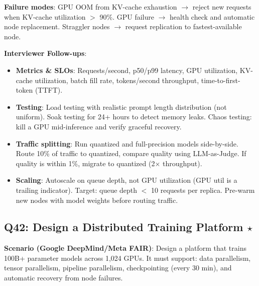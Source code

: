 \textbf{Failure modes}: GPU OOM from KV-cache exhaustion $\to$ reject new requests when KV-cache utilization $>$ 90\%. GPU failure $\to$ health check and automatic node replacement. Straggler nodes $\to$ request replication to fastest-available node.

\textbf{Interviewer Follow-ups}:
\begin{itemize}[leftmargin=*]
    \item \textbf{Metrics \& SLOs}: Requests/second, p50/p99 latency, GPU utilization, KV-cache utilization, batch fill rate, tokens/second throughput, time-to-first-token (TTFT).
    \item \textbf{Testing}: Load testing with realistic prompt length distribution (not uniform). Soak testing for 24+ hours to detect memory leaks. Chaos testing: kill a GPU mid-inference and verify graceful recovery.
    \item \textbf{Traffic splitting}: Run quantized and full-precision models side-by-side. Route 10\% of traffic to quantized, compare quality using LLM-as-Judge. If quality is within 1\%, migrate to quantized (2$\times$ throughput).
    \item \textbf{Scaling}: Autoscale on queue depth, not GPU utilization (GPU util is a trailing indicator). Target: queue depth $<$ 10 requests per replica. Pre-warm new nodes with model weights before routing traffic.
\end{itemize}

\subsection{Q42: Design a Distributed Training Platform $\star$}

\textbf{Scenario (Google DeepMind/Meta FAIR)}: Design a platform that trains 100B+ parameter models across 1,024 GPUs. It must support: data parallelism, tensor parallelism, pipeline parallelism, checkpointing (every 30 min), and automatic recovery from node failures.

